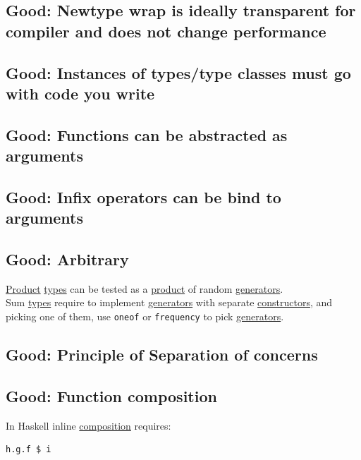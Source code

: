 \documentclass[11pt]{article}
\begin{document}
\subsection{\label{org01c9b3a}Good: Newtype wrap is ideally transparent for compiler and does not change performance}
\label{sec:orgbfe7e7e}

\subsection{\label{org4ae4ccc}Good: Instances of types/type classes must go with code you write}
\label{sec:orgc5fafff}

\subsection{\label{org046a739}Good: Functions can be abstracted as arguments}
\label{sec:orgf65d1cc}

\subsection{\label{org346eb5b}Good: Infix operators can be bind to arguments}
\label{sec:orgd96975a}

\subsection{\label{orge122923}Good: Arbitrary}
\label{sec:org14bb3bf}
\hyperref[org80a0b6e]{Product} \hyperref[org4209edd]{types} can be tested as a \hyperref[org80a0b6e]{product} of random \hyperref[org6e492b5]{generators}.\\
Sum \hyperref[org4209edd]{types} require to implement \hyperref[org6e492b5]{generators} with separate \hyperref[org7a9d75a]{constructors}, and picking one of them, use \texttt{oneof} or \texttt{frequency} to pick \hyperref[org6e492b5]{generators}.\\

\subsection{\label{org5e06b9a}Good: Principle of Separation of concerns}
\label{sec:orgd533b5c}

\subsection{\label{org558b56d}Good: Function composition}
\label{sec:orgbc92372}
In Haskell inline \hyperref[orga128e7f]{composition} requires:\\
\begin{verbatim}
h.g.f $ i
\end{verbatim}
\end{document}
